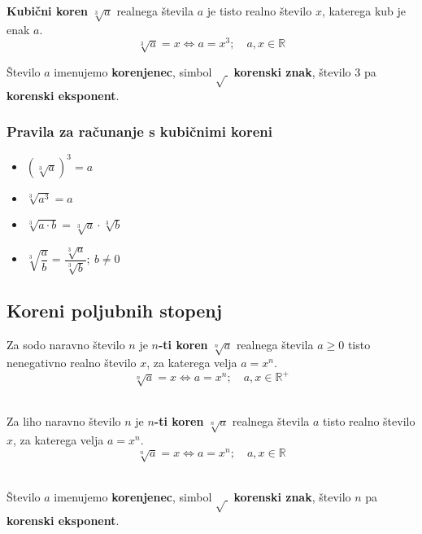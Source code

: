                \textbf{Kubični koren} $\sqrt[3]{a}$ realnega števila $a$ je tisto realno število $x$,
                katerega kub je enak $a$.
                $$\sqrt[3]{a}=x \Leftrightarrow a=x^3; \quad a,x\in\mathbb{R}$$

                Število $a$ imenujemo \textbf{korenjenec}, simbol $\sqrt{~}$ \textbf{korenski znak}, število $3$ pa \textbf{korenski eksponent}.
            

            \subsubsection*{Pravila za računanje s kubičnimi koreni}
                
                    \begin{itemize}
                        \item $\left(\sqrt[3]{a}\right)^3=a$
                        \item $\sqrt[3]{a^3}=a$
                        \item $\sqrt[3]{a\cdot b}=\sqrt[3]{a}\cdot\sqrt[3]{b}$
                        \item $\sqrt[3]{\dfrac{a}{b}}=\dfrac{\sqrt[3]{a}}{\sqrt[3]{b}}; ~b\neq 0$
                    \end{itemize}
                
            

        


        
            \subsection{Koreni poljubnih stopenj}

                Za sodo naravno število $n$ je \textbf{$n$-ti koren} $\sqrt[n]{a}$ realnega števila $a\geq 0$ tisto nenegativno realno število $x$,
                za katerega velja $a=x^n$.
                $$\displaystyle \sqrt[n]{a}=x \Leftrightarrow a=x^n; \quad a,x\in\mathbb{R}^+ $$
                ~
                
                Za liho naravno število $n$ je \textbf{$n$-ti koren} $\sqrt[n]{a}$ realnega števila $a$ tisto realno število $x$,
                za katerega velja $a=x^n$.
                $$\displaystyle \sqrt[n]{a}=x \Leftrightarrow a=x^n; \quad a,x\in\mathbb{R} $$
                ~
                
                Število $a$ imenujemo \textbf{korenjenec}, simbol $\sqrt{~}$ \textbf{korenski znak}, število $n$ pa \textbf{korenski eksponent}.
            

